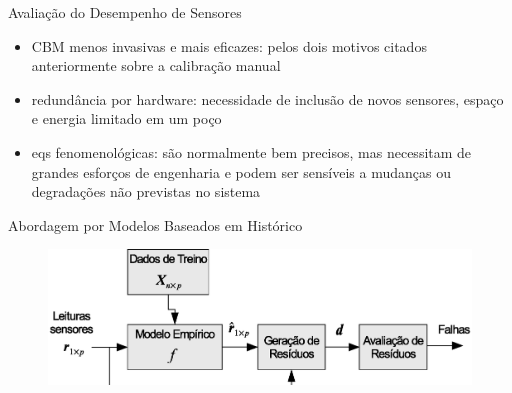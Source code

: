 \documentclass{beamer}
\begin{document}
\begin{frame}{Avaliação do Desempenho de Sensores}
{\begin{itemize}
        \item CBM menos invasivas e mais eficazes: pelos dois motivos citados
            anteriormente sobre a calibração manual
            \vspace{15pt}
        \item redundância por hardware: necessidade de inclusão de novos sensores, espaço
            e energia limitado em um poço
        \item eqs fenomenológicas: são normalmente bem precisos, mas necessitam de grandes
            esforços de engenharia e podem ser sensíveis a mudanças ou degradações não
            previstas no sistema
    \end{itemize}}
    
\end{frame}

\begin{frame}{Abordagem por Modelos Baseados em Histórico}
    
    \begin{figure}[!htb]
        \centering\hspace*{-20pt}
        \includegraphics[width=1.1\textwidth]{figuras/data_driven_fdd.eps}
    \end{figure}
    
\end{frame}
\end{document}
